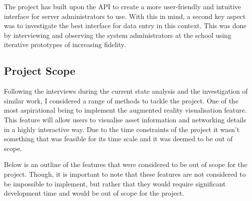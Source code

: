 \documentclass [11pt,a4paper]{article}
\begin{document}
The project has built upon the API to create a more user-friendly and intuitive interface for server administrators to use. With this in mind, a second key aspect was to investigate the best interface for data entry in this context. This was done by interviewing and observing the system administrators at the school using iterative prototypes of increasing fidelity.

\subsection{Project Scope}
\label{sec:stretchgoals}


Following the interviews during the current state analysis and the investigation of similar work, I considered a range of methods to tackle the project. One of the most aspirational being to implement the augmented reality visualisation feature. This feature will allow users to visualise asset information and networking details in a highly interactive way. Due to the time constraints of the project it wasn't something that was feasible for its time scale and it was deemed to be out of scope. 

Below is an outline of the features that were considered to be out of scope for the project. Though, it is important to note that these features are not considered to be impossible to implement, but rather that they would require significant development time and would be out of scope for the project.
\end{document}
